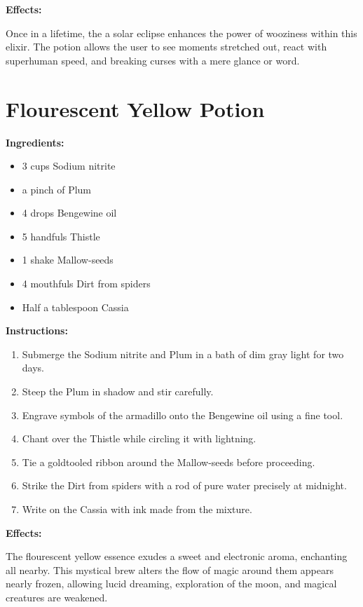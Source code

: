 \documentclass{article}
\begin{document}
\textbf{Effects:}

Once in a lifetime, the a solar eclipse enhances the power of wooziness within this elixir. The potion allows the user to see moments stretched out, react with superhuman speed, and breaking curses with a mere glance or word.

\newpage
\section*{Flourescent Yellow Potion}

\textbf{Ingredients:}

\begin{itemize}
  \item 3 cups Sodium nitrite
  \item a pinch of Plum
  \item 4 drops Bengewine oil
  \item 5 handfuls Thistle
  \item 1 shake Mallow-seeds
  \item 4 mouthfuls Dirt from spiders
  \item Half a tablespoon Cassia
\end{itemize}

\textbf{Instructions:}

\begin{enumerate}
  \item Submerge the Sodium nitrite and Plum in a bath of dim gray light for two days.
  \item Steep the Plum in shadow and stir carefully.
  \item Engrave symbols of the armadillo onto the Bengewine oil using a fine tool.
  \item Chant over the Thistle while circling it with lightning.
  \item Tie a goldtooled ribbon around the Mallow-seeds before proceeding.
  \item Strike the Dirt from spiders with a rod of pure water precisely at midnight.
  \item Write on the Cassia with ink made from the mixture.
\end{enumerate}

\textbf{Effects:}

The flourescent yellow essence exudes a sweet and electronic aroma, enchanting all nearby. This mystical brew alters the flow of magic around them appears nearly frozen, allowing lucid dreaming, exploration of the moon, and magical creatures are weakened.
\end{document}
